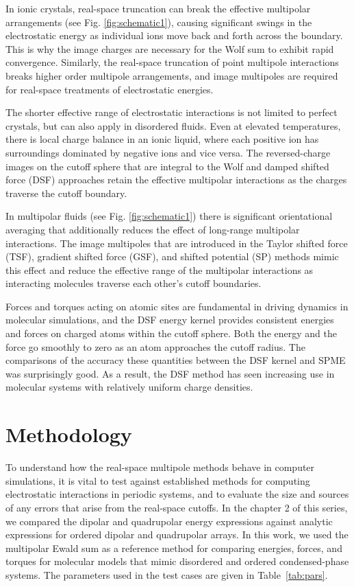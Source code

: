 In ionic crystals, real-space truncation can break the effective
multipolar arrangements (see Fig. \ref{fig:schematic1}), causing
significant swings in the electrostatic energy as individual ions move
back and forth across the boundary.  This is why the image charges are
necessary for the Wolf sum to exhibit rapid convergence.  Similarly,
the real-space truncation of point multipole interactions breaks
higher order multipole arrangements, and image multipoles are required
for real-space treatments of electrostatic energies.

The shorter effective range of electrostatic interactions is not
limited to perfect crystals, but can also apply in disordered fluids.
Even at elevated temperatures, there is local charge balance in an
ionic liquid, where each positive ion has surroundings dominated by
negative ions and vice versa.  The reversed-charge images on the
cutoff sphere that are integral to the Wolf and damped shifted force
(DSF) approaches retain the effective multipolar interactions as the
charges traverse the cutoff boundary.

In multipolar fluids (see Fig. \ref{fig:schematic1}) there is
significant orientational averaging that additionally reduces the
effect of long-range multipolar interactions.  The image multipoles
that are introduced in the Taylor shifted force (TSF), gradient
shifted force (GSF), and shifted potential (SP) methods mimic this effect and reduce the effective range of the multipolar interactions as
interacting molecules traverse each other's cutoff boundaries.

Forces and torques acting on atomic sites are fundamental in driving
dynamics in molecular simulations, and the DSF energy kernel provides
consistent energies and forces on charged atoms within the cutoff
sphere. Both the energy and the force go smoothly to zero as an atom
approaches the cutoff radius. The comparisons of the accuracy these
quantities between the DSF kernel and SPME was surprisingly
good.\cite{Gezelter06} As a result, the DSF method has seen
increasing use in molecular systems with relatively uniform charge
densities. \cite{English08,Kannam13,Forrest12,Louden13,McCann13,Shi13,Tokumasu13}

\section{Methodology}
To understand how the real-space multipole methods behave in computer
simulations, it is vital to test against established methods for
computing electrostatic interactions in periodic systems, and to
evaluate the size and sources of any errors that arise from the
real-space cutoffs.  In the chapter 2 of this series, we compared
the dipolar and quadrupolar energy expressions against analytic
expressions for ordered dipolar and quadrupolar
arrays.\cite{Sauer,LT,Nagai60,Nagai63} In this work, we
used the multipolar Ewald sum as a reference method for comparing
energies, forces, and torques for molecular models that mimic
disordered and ordered condensed-phase systems.  The parameters used
in the test cases are given in Table~\ref{tab:pars}. 

